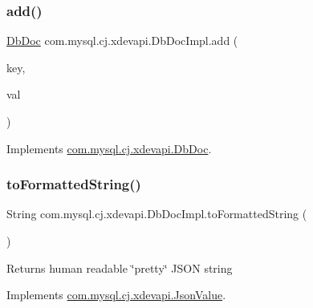 \subsubsection{\texorpdfstring{add()}{add()}}
{\footnotesize\ttfamily \mbox{\hyperlink{interfacecom_1_1mysql_1_1cj_1_1xdevapi_1_1_db_doc}{Db\+Doc}} com.\+mysql.\+cj.\+xdevapi.\+Db\+Doc\+Impl.\+add (\begin{DoxyParamCaption}\item[{String}]{key,  }\item[{\mbox{\hyperlink{interfacecom_1_1mysql_1_1cj_1_1xdevapi_1_1_json_value}{Json\+Value}}}]{val }\end{DoxyParamCaption})}



Implements \mbox{\hyperlink{interfacecom_1_1mysql_1_1cj_1_1xdevapi_1_1_db_doc_a49318fdc8c741c373d2cae74292bb29d}{com.\+mysql.\+cj.\+xdevapi.\+Db\+Doc}}.

\mbox{\label{classcom_1_1mysql_1_1cj_1_1xdevapi_1_1_db_doc_impl_a4880b999d135b6a871d605b523fc1529}} 
\subsubsection{\texorpdfstring{to\+Formatted\+String()}{toFormattedString()}}
{\footnotesize\ttfamily String com.\+mysql.\+cj.\+xdevapi.\+Db\+Doc\+Impl.\+to\+Formatted\+String (\begin{DoxyParamCaption}{ }\end{DoxyParamCaption})}

\begin{DoxyReturn}{Returns}
human readable \char`\"{}pretty\char`\"{} J\+S\+ON string 
\end{DoxyReturn}


Implements \mbox{\hyperlink{interfacecom_1_1mysql_1_1cj_1_1xdevapi_1_1_json_value_aed42bf9ff63b3cd329cb1fabcf9dfe41}{com.\+mysql.\+cj.\+xdevapi.\+Json\+Value}}.

\mbox{\label{classcom_1_1mysql_1_1cj_1_1xdevapi_1_1_db_doc_impl_abcc9b6b3b3d9cbd802d4a4e141e26c22}} 
